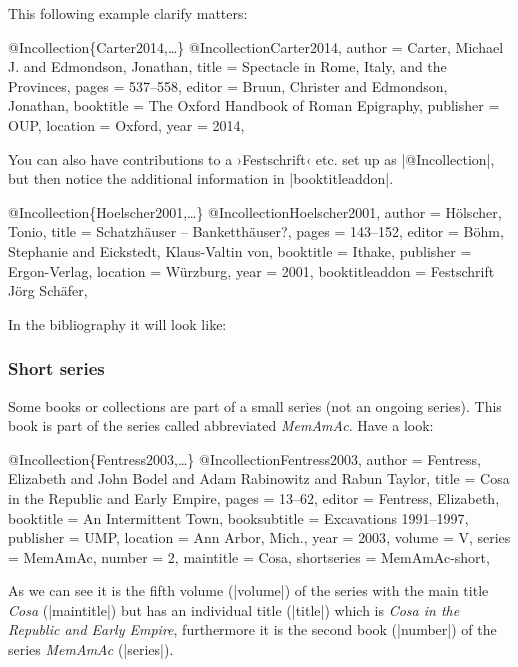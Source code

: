 \documentclass[a4paper,
10pt,
greek,
french,
spanish,
italian,
ngerman,
english
]{ltxdoc}
\begin{document}
 
 
This following example clarify matters:
 \begin{bibexample}[label=Carter2014]{{@}Incollection\{Carter2014,…\}}
@Incollection{Carter2014,
  author    = {Carter, Michael J. and Edmondson, Jonathan},
  title     = {Spectacle in Rome, Italy, and the Provinces},
  pages     = {537--558},
  editor    = {Bruun, Christer and Edmondson, Jonathan},
  booktitle = {The Oxford Handbook of Roman Epigraphy},
  publisher = OUP,    %
  location  = {Oxford},
  year      = {2014},
}
\end{bibexample}


You can also have contributions to a ›Festschrift‹ etc. set up as |@Incollection|,
but then notice the additional information in |booktitleaddon|.
\begin{bibexample}[label=Hoelscher2001]{{@}Incollection\{Hoelscher2001,…\}}
@Incollection{Hoelscher2001,
  author         = {Hölscher, Tonio},
  title          = {Schatzhäuser -- Banketthäuser?},
  pages          = {143--152},
  editor         = {Böhm, Stephanie and Eickstedt, Klaus-Valtin von},
  booktitle      = {Ithake},
  publisher      = {Ergon-Verlag},
  location       = {Würzburg},
  year           = {2001},
  booktitleaddon = {Festschrift Jörg Schäfer},
}
\end{bibexample}
In the bibliography it will look like:

\subsubsection{Short series}
Some books or collections are part of a small series (not an ongoing series).
This book is part of the series called abbreviated \emph{MemAmAc}.
Have a look:
\begin{bibexample}[label=Fentress2003]{{@}Incollection\{Fentress2003,…\}}
@Incollection{Fentress2003,
  author       = {Fentress, Elizabeth and John Bodel and Adam Rabinowitz and Rabun Taylor},
  title        = {Cosa in the Republic and Early Empire},
  pages        = {13--62},
  editor       = {Fentress, Elizabeth},
  booktitle    = {An Intermittent Town},
  booksubtitle = {Excavations 1991--1997},
  publisher    = UMP,    %
  location     = {Ann Arbor, Mich.},
  year         = {2003},
  volume       = {V},
  series       = MemAmAc,    %
  number       = {2},
  maintitle    = {Cosa},
  shortseries  = MemAmAc-short,    %
}
\end{bibexample}
As we can see it is the fifth volume (|volume|) of the series with the main title 
\emph{Cosa} (|maintitle|) but has an individual title (|title|) which is
\emph{Cosa in the Republic and Early Empire}, furthermore it is the second book (|number|) 
of the series  \emph{MemAmAc} (|series|).
\end{document}
